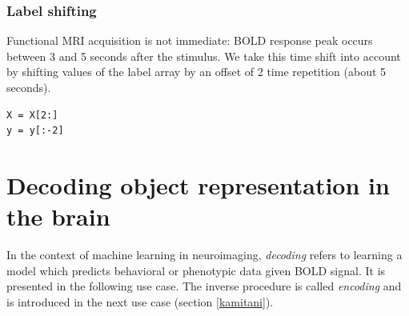 \documentclass{frontiersSCNS} %
\newcommand{\alex}[1]{\todo[inline, color=green!40]{#1}}
\newcounter{x}
\newcounter{y}
\newcounter{z}
\begin{document}



\subsubsection{Label shifting}

Functional MRI acquisition is not immediate: BOLD response peak occurs between 3
and 5 seconds after the stimulus. We take this time shift into account by
shifting values of the label array by an offset of 2 time repetition (about 5
seconds).



\begin{lstlisting}
X = X[2:]
y = y[:-2]
\end{lstlisting}

\section{Decoding object representation in the brain}

In the context of machine learning in neuroimaging, \textit{decoding} refers to learning a model
which predicts behavioral or phenotypic data given BOLD signal. It is presented
in the following use case. The inverse procedure is
called \textit{encoding} \citep{naselaris2011} and is introduced in the next use case
(section \ref{kamitani}).
\end{document}
